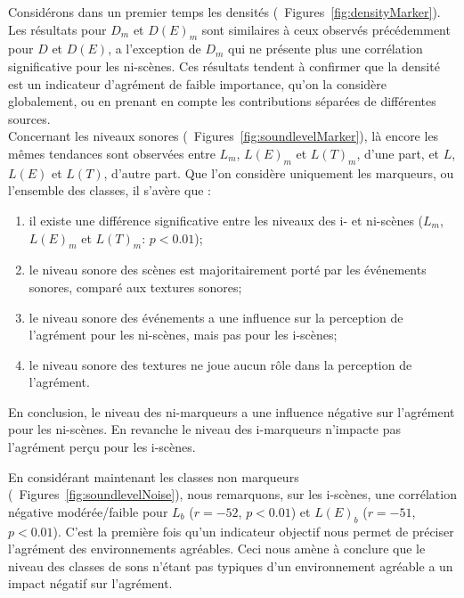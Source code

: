 Considérons dans un premier temps les densités (\cf~Figures~\ref{fig:densityMarker}). Les résultats pour $D_m$ et $D(E)_m$ sont similaires à ceux observés précédemment pour $D$ et $D(E)$, a l'exception de $D_m$ qui ne présente plus une corrélation significative pour les ni-scènes. Ces résultats tendent à confirmer que la densité est un indicateur d'agrément de faible importance, qu'on la considère globalement, ou en prenant en compte les contributions séparées de différentes sources. \\


Concernant les niveaux sonores (\cf~Figures~\ref{fig:soundlevelMarker}), là encore les mêmes tendances sont observées entre $L_m$, $L(E)_m$ et $L(T)_m$, d'une part, et $L$, $L(E)$ et $L(T)$, d'autre part. Que l'on considère uniquement les marqueurs, ou l'ensemble des classes, il s'avère que :

\begin{enumerate}
\item il existe une différence significative entre les niveaux des i- et ni-scènes ($L_m$, $L(E)_m$ et $L(T)_m$: $p<0.01$);
\item le niveau sonore des scènes est majoritairement porté par les événements sonores, comparé aux textures sonores;
\item le niveau sonore des événements a une influence sur la perception de l'agrément pour les ni-scènes, mais pas pour les i-scènes;
\item le niveau sonore des textures ne joue aucun rôle dans la perception de l'agrément.
\end{enumerate}

En conclusion, le niveau des ni-marqueurs a une influence négative sur l'agrément pour les ni-scènes. En revanche le niveau des i-marqueurs n’impacte pas l'agrément perçu pour les i-scènes.

En considérant maintenant les classes non marqueurs  (\cf~Figures~\ref{fig:soundlevelNoise}), nous remarquons, sur les i-scènes, une corrélation négative modérée/faible pour $L_b$  ($r=-52$, $p<0.01$) et $L(E)_b$ ($r=-51$, $p<0.01$). C'est la première fois qu'un indicateur objectif nous permet de préciser l'agrément des environnements agréables. Ceci nous amène à conclure que le niveau des classes de sons n'étant pas typiques d'un environnement agréable a un impact négatif sur l'agrément. 

